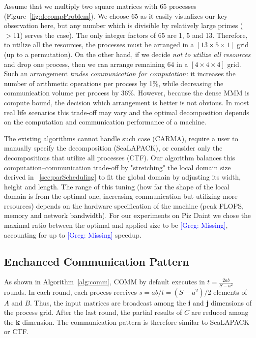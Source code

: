 \documentclass[sigplan,review,anonymous,10pt]{acmart}\settopmatter{printfolios=true,printccs=false,printacmref=false}
\newcommand\greg[1]{\textcolor{blue}{[Greg: #1]}}
\begin{document}
Assume that we multiply two square matrices with 65 
processes (Figure~\ref{fig:decompProblem}). We choose 65 as it easily 
visualizes our key observation here, but any number which is divisible by 
relatively large primes ($>11$) serves the case).
  The only integer factors 
of 65 are 1, 5 and 13. Therefore, to 
utilize all the resources, the processes must be arranged in a $[13 
\times 5 \times 1]$ grid (up to a permutation). On the other hand, if 
we decide \emph{not to utilize all resources} 
and drop one process, then we can arrange remaining 64 in a $[4 
\times 4 \times 4]$ grid. Such an arrangement \emph{trades communication 
	for computation:} it increases the number of arithmetic operations 
per process by 1\%, while decreasing the communication volume per 
process by 36\%. However, because the dense MMM is compute bound, the 
decision which arrangement is better is not obvious.
In most real life scenarios this trade-off may vary and the optimal 
decomposition depends on the computation and communication 
performance 
of a 
machine. 



The existing algorithms cannot handle such case (CARMA), 
require a user to manually specify the decomposition (ScaLAPACK), or 
consider only the decompositions that utilize all processes
(CTF). Our algorithm balances this computation--communication 
trade-off by "stretching" the local domain size 
derived in ~\cref{sec:parScheduling} to fit the global 
domain by adjusting its width, height and length. The range of this 
tuning (how far the shape of the local domain is from the optimal one, 
increasing communication but utilizing more resources) 
depends on the hardware specification of the 
machine (peak FLOPS, memory and network bandwidth). For our 
experiments on Piz Daint we chose the maximal ratio between the 
optimal and applied size to be \greg{Missing}, accounting for up to 
\greg{Missing} speedup.

\subsection{Enchanced Communication Pattern}
\label{sec:commPattern}
As shown in Algorithm~\ref{alg:comm}, COMM by default executes in $t = 
\frac{2ab}{S - a^2}$ 
rounds. In each round, each process receives $s = ab/t = (S - a^2)/2$ 
elements of 
$A$ 
and 
$B$. Thus, the input matrices are broadcast among the \textbf{i} and \textbf{j} 
dimensions of the process grid. After the last round, the partial results of 
$C$ 
are reduced among the \textbf{k} dimension. The communication pattern is 
therefore similar to ScaLAPACK or CTF.
\end{document}
